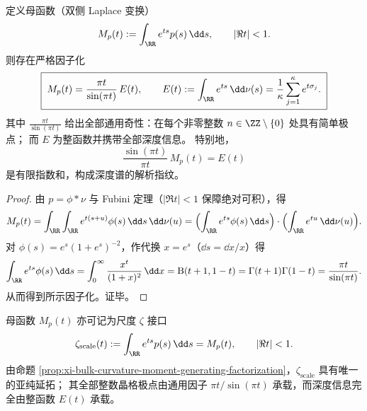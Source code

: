 \begin{proposition}\label{prop:xi-bulk-curvature-moment-generating-factorization}
定义母函数（双侧 Laplace 变换）
\[
M_p(t):=\int_{\RR}e^{ts}p(s)\,\dd s,
\qquad |\Re t|<1.
\]
则存在严格因子化
\[
\boxed{\;
M_p(t)=\frac{\pi t}{\sin(\pi t)}\,E(t),\qquad
E(t):=\int_{\RR}e^{ts}\,\dd\nu(s)=\frac{1}{\kappa}\sum_{j=1}^{\kappa}e^{t\sigma_j}.\;}
\]
其中 \(\frac{\pi t}{\sin(\pi t)}\) 给出全部通用奇性：在每个非零整数 \(n\in\ZZ\setminus\{0\}\) 处具有简单极点；
而 \(E\) 为整函数并携带全部深度信息。
特别地，
\[
\boxed{\;\frac{\sin(\pi t)}{\pi t}\,M_p(t)=E(t)\;}
\]
是有限指数和，构成深度谱的解析指纹。
\end{proposition}
\begin{proof}
由 \(p=\phi*\nu\) 与 Fubini 定理（\(|\Re t|<1\) 保障绝对可积），得
\[
M_p(t)=\int_{\RR}\int_{\RR}e^{t(s+u)}\phi(s)\,\dd s\,\dd\nu(u)
=\Bigl(\int_{\RR}e^{ts}\phi(s)\,\dd s\Bigr)\cdot\Bigl(\int_{\RR}e^{tu}\,\dd\nu(u)\Bigr).
\]
对 \(\phi(s)=e^{s}(1+e^{s})^{-2}\)，作代换 \(x=e^{s}\)（\(\dd s=\dd x/x\)）得
\[
\int_{\RR}e^{ts}\phi(s)\,\dd s
=\int_{0}^{\infty}\frac{x^{t}}{(1+x)^{2}}\,\dd x
=\mathrm{B}(t+1,1-t)
=\Gamma(t+1)\Gamma(1-t)
=\frac{\pi t}{\sin(\pi t)}.
\]
从而得到所示因子化。证毕。
\end{proof}

\begin{remark}\label{rem:xi-bulk-curvature-scale-zeta-notation}
母函数 \(M_p(t)\) 亦可记为尺度 \(\zeta\) 接口
\[
\zeta_{\mathrm{scale}}(t):=\int_{\RR}e^{ts}p(s)\,\dd s=M_p(t),
\qquad
|\Re t|<1.
\]
由命题 \ref{prop:xi-bulk-curvature-moment-generating-factorization}，\(\zeta_{\mathrm{scale}}\) 具有唯一的亚纯延拓；
其全部整数晶格极点由通用因子 \(\pi t/\sin(\pi t)\) 承载，而深度信息完全由整函数 \(E(t)\) 承载。
\end{remark}

